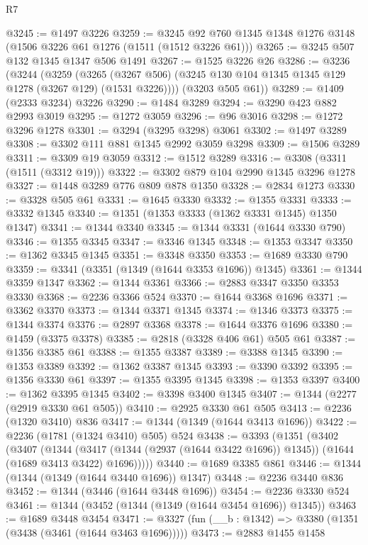 \begin{lexlean}{R7}
\begin{coremodule}
@3245 := @1497 @3226
@3259 := @3245 @92 @760 @1345 @1348 @1276 @3148 (@1506 @3226 @61 @1276 (@1511 (@1512 @3226 @61)))
@3265 := @3245 @507 @132 @1345 @1347 @506 @1491
@3267 := @1525 @3226 @26
@3286 := @3236
    (@3244
      (@3259
        (@3265 (@3267 @506) (@3245 @130 @104 @1345 @1345 @129 @1278 (@3267 @129) (@1531 @3226))))
      (@3203 @505 @61))
@3289 := @1409 (@2333 @3234) @3226
@3290 := @1484 @3289
@3294 := @3290 @423 @882 @2993 @3019
@3295 := @1272 @3059
@3296 := @96 @3016
@3298 := @1272 @3296 @1278
@3301 := @3294 (@3295 @3298) @3061
@3302 := @1497 @3289
@3308 := @3302 @111 @881 @1345 @2992 @3059 @3298
@3309 := @1506 @3289
@3311 := @3309 @19 @3059
@3312 := @1512 @3289
@3316 := @3308 (@3311 (@1511 (@3312 @19)))
@3322 := @3302 @879 @104 @2990 @1345 @3296 @1278
@3327 := @1448 @3289 @776 @809 @878 @1350
@3328 := @2834 @1273
@3330 := @3328 @505 @61
@3331 := @1645 @3330
@3332 := @1355 @3331
@3333 := @3332 @1345
@3340 := @1351 (@1353 @3333 (@1362 @3331 @1345) @1350 @1347)
@3341 := @1344 @3340
@3345 := @1344 @3331 (@1644 @3330 @790)
@3346 := @1355 @3345
@3347 := @3346 @1345
@3348 := @1353 @3347
@3350 := @1362 @3345 @1345
@3351 := @3348 @3350
@3353 := @1689 @3330 @790
@3359 := @3341 (@3351 (@1349 (@1644 @3353 @1696)) @1345)
@3361 := @1344 @3359 @1347
@3362 := @1344 @3361
@3366 := @2883 @3347 @3350 @3353 @3330
@3368 := @2236 @3366 @524
@3370 := @1644 @3368 @1696
@3371 := @3362 @3370
@3373 := @1344 @3371 @1345
@3374 := @1346 @3373
@3375 := @1344 @3374
@3376 := @2897 @3368
@3378 := @1644 @3376 @1696
@3380 := @1459 (@3375 @3378)
@3385 := @2818 (@3328 @406 @61) @505 @61
@3387 := @1356 @3385 @61
@3388 := @1355 @3387
@3389 := @3388 @1345
@3390 := @1353 @3389
@3392 := @1362 @3387 @1345
@3393 := @3390 @3392
@3395 := @1356 @3330 @61
@3397 := @1355 @3395 @1345
@3398 := @1353 @3397
@3400 := @1362 @3395 @1345
@3402 := @3398 @3400 @1345
@3407 := @1344 (@2277 (@2919 @3330 @61 @505))
@3410 := @2925 @3330 @61 @505
@3413 := @2236 (@1320 @3410) @836
@3417 := @1344 (@1349 (@1644 @3413 @1696))
@3422 := @2236 (@1781 (@1324 @3410) @505) @524
@3438 := @3393
    (@1351
      (@3402
        (@3407
          (@1344
            (@3417 (@1344 (@2937 (@1644 @3422 @1696)) @1345))
            (@1644 (@1689 @3413 @3422) @1696)))))
@3440 := @1689 @3385 @861
@3446 := @1344 (@1344 (@1349 (@1644 @3440 @1696)) @1347)
@3448 := @2236 @3440 @836
@3452 := @1344 (@3446 (@1644 @3448 @1696))
@3454 := @2236 @3330 @524
@3461 := @1344 (@3452 (@1344 (@1349 (@1644 @3454 @1696)) @1345))
@3463 := @1689 @3448 @3454
@3471 := @3327 (fun (__b : @1342) => @3380 (@1351 (@3438 (@3461 (@1644 @3463 @1696)))))
@3473 := @2883 @1455 @1458

\end{coremodule}
\end{lexlean}
